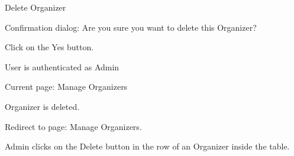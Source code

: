 
\begin{uc}{Delete Organizer}


    \begin{uc-mss}
    \item Confirmation dialog: Are you sure you want to delete this Organizer?
    \item Click on the Yes button.
    \end{uc-mss}

    \begin{uc-pre}
    \item User is authenticated as Admin
    \item Current page: Manage Organizers
    \end{uc-pre}

    \begin{uc-post}
    \item Organizer is deleted.
    \item Redirect to page: Manage Organizers.
    \end{uc-post}

    \begin{uc-trig}
        Admin clicks on the Delete button in the row of an Organizer inside the table.
    \end{uc-trig}

\end{uc}


